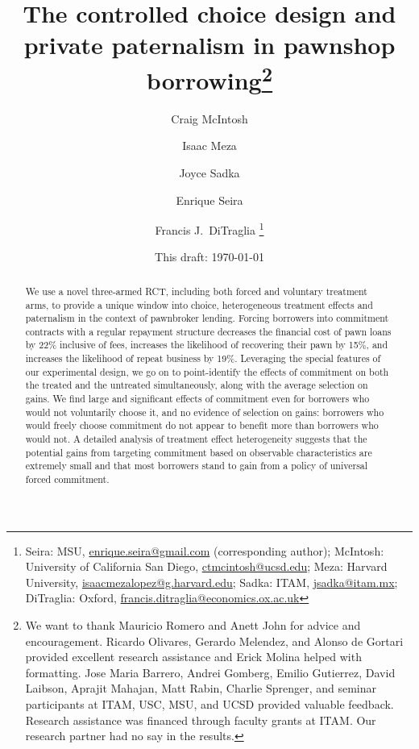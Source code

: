 \documentclass[12pt, a4paper]{article}
\begin{document}
\title{The controlled choice design and private paternalism in pawnshop borrowing\thanks{We want to thank Mauricio Romero and Anett John for advice and encouragement. Ricardo Olivares, Gerardo Melendez, and Alonso de Gortari provided excellent research assistance and Erick Molina helped with formatting. Jose Maria Barrero, Andrei Gomberg, Emilio Gutierrez, David Laibson, Aprajit Mahajan, Matt Rabin, Charlie Sprenger, and seminar participants at ITAM, USC, MSU, and UCSD provided valuable feedback. Research assistance was financed through faculty grants at ITAM. Our research partner had no say in the results.}}
\author{Craig McIntosh \and Isaac Meza \and Joyce Sadka \and Enrique Seira \and Francis J.\ DiTraglia   \thanks{Seira:  MSU, \url{enrique.seira@gmail.com} (corresponding author); McIntosh:  University of California San Diego, \url{ctmcintosh@ucsd.edu}; Meza: Harvard University, \url{isaacmezalopez@g.harvard.edu}; Sadka: ITAM, \url{jsadka@itam.mx}; DiTraglia: Oxford, \url{francis.ditraglia@economics.ox.ac.uk}} }
\date{This draft:  \today \\[2 cm]}



\maketitle
\vspace{-0.75in}

\begin{abstract}
We use a novel three-armed RCT, including both forced and voluntary treatment arms, to provide a unique window into choice, heterogeneous treatment effects and paternalism in the context of pawnbroker lending. Forcing borrowers into commitment contracts with a regular repayment structure decreases the financial cost of pawn loans by 22\% inclusive of fees, increases the likelihood of recovering their pawn by 15\%, and increases the likelihood of repeat business by 19\%. Leveraging the special features of our experimental design, we go on to point-identify the effects of commitment on both the treated and the untreated simultaneously, along with the average selection on gains. We find large and significant effects of commitment even for borrowers who would not voluntarily choose it, and no evidence of selection on gains: borrowers who would freely choose commitment do not appear to benefit more than borrowers who would not. A detailed analysis of treatment effect heterogeneity suggests that the potential gains from targeting commitment based on observable characteristics are extremely small and that most borrowers stand to gain from a policy of universal forced commitment.
\end{abstract}
\end{document}
